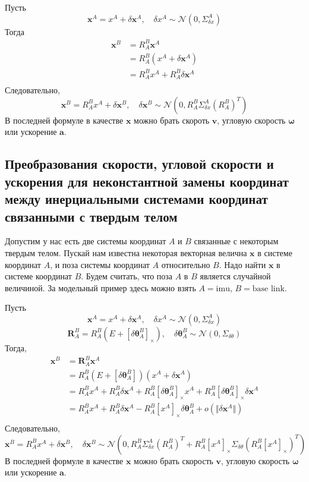 \documentclass[12pt]{article}
\begin{document}
Пусть
$$
    \pmb{x}^A=x^A+\delta \pmb{x}^A,
    \quad
    \delta x^A\sim\mathcal{N}(0, \Sigma_{\delta x}^A)
$$
Тогда
$$
    \begin{aligned}
        \pmb{x}^B
         & =R_A^B \pmb{x}^A                    \\
         & =R_A^B (x^A + \delta \pmb{x}^A)     \\
         & =R_A^B x^A + R_A^B \delta \pmb{x}^A \\
    \end{aligned}
$$
Следовательно,
\begin{equation}
    \pmb{x}^B=R_A^Bx^A+\delta \pmb{x}^B,
    \quad
    \delta \pmb{x}^B\sim\mathcal{N}(0, R_A^B \Sigma_{\delta x}^A (R_A^B)^T)
\end{equation}
В последней формуле в качестве $\pmb{x}$ можно брать скороть $\pmb{v}$, угловую
скорость $\pmb{\omega}$ или ускорение $\pmb{a}$.

\subsection{Преобразования скорости, угловой скорости и ускорения для
    неконстантной замены координат между инерциальными системами
    координат связанными с твердым телом
}

Допустим у нас есть две системы координат $A$ и $B$ связанные с некоторым
твердым телом. Пускай нам известна некоторая векторная велична $\pmb{x}$ в
системе координат $A$, и поза системы координат $A$ относительно $B$.
Надо найти $\pmb{x}$ в системе координат $B$. Будем считать, что поза $A$
в $B$ является случайной величиной. За модельный пример здесь можно
взять $A=\mbox{imu}$, $B=\mbox{base link}$.

Пусть
$$
    \pmb{x}^A=x^A+\delta \pmb{x}^A, \quad \delta x^A\sim\mathcal{N}(0, \Sigma_{\delta x}^A)
$$
$$
    \pmb{R}_A^B=R_A^B(E+[\delta \pmb{\theta}_A^B]_\times),
    \quad
    \delta\pmb{\theta}_A^B \sim \mathcal{N}(0, \Sigma_{\delta \theta})
$$
Тогда,
$$
    \begin{aligned}
        \pmb{x}^B
         & =\pmb{R}_A^B \pmb{x}^A                                        \\
         & =R_A^B (E+[\delta \pmb{\theta}_A^B]) (x^A + \delta \pmb{x}^A) \\
         & =R_A^B x^A + R_A^B \delta \pmb{x}^A
        + R_A^B [\delta \pmb{\theta}_A^B]_\times x^A
        + R_A^B [\delta \pmb{\theta}_A^B]_\times \delta \pmb{x}^A        \\
         & =R_A^B x^A + R_A^B \delta \pmb{x}^A
        - R_A^B [x^A]_\times \delta \pmb{\theta}_A^B
        + o(\Vert \delta\pmb{x}^A \Vert)                                 \\
    \end{aligned}
$$
Следовательно,
\begin{equation}
    \pmb{x}^B=R_A^Bx^A+\delta \pmb{x}^B,
    \quad
    \delta \pmb{x}^B\sim\mathcal{N}(
    0,
    R_A^B \Sigma_{\delta x}^A (R_A^B)^T
    + R_A^B [x^A]_\times \Sigma_{\delta\theta} (R_A^B [x^A]_\times)^T
    )
\end{equation}
В последней формуле в качестве $\pmb{x}$ можно брать скорость $\pmb{v}$,
угловую скорость $\pmb{\omega}$ или ускорение $\pmb{a}$.
\end{document}
